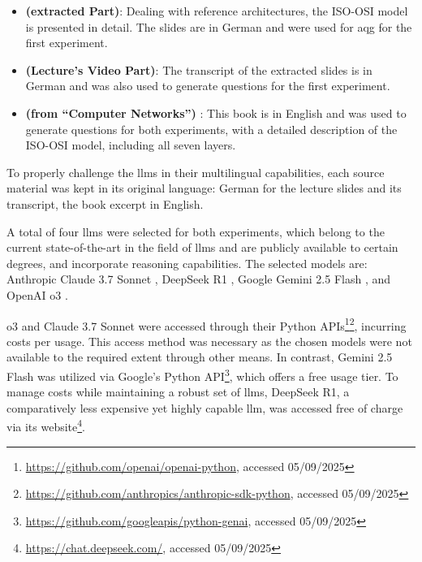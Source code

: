 \begin{itemize}
    \item {} \textbf{(extracted Part)}: Dealing with reference architectures, the ISO-OSI model is presented in detail. The slides are in German and were used for \ac{aqg} for the first experiment.
    \item {} \textbf{(Lecture's Video Part)}: The transcript of the extracted slides is in German and was also used to generate questions for the first experiment.
    \item {} \textbf{(from \enquote{Computer Networks})} \cite{tanenbaum_computer_2013}: This book is in English and was used to generate questions for both experiments, with a detailed description of the ISO-OSI model, including all seven layers.
\end{itemize}

To properly challenge the \ac{llms} in their multilingual capabilities, each source material was kept in its original language: German for the lecture slides and its transcript, the book excerpt in English.

\pagebreak

 A total of four \ac{llms} were selected for both experiments, which belong to the current state-of-the-art in the field of \ac{llms} and are publicly available to certain degrees, and incorporate reasoning capabilities. The selected models are:
Anthropic Claude 3.7 Sonnet \cite{anthropic_claude_2025},
    DeepSeek R1 \cite{deepseek-ai_deepseek-r1_2025},
    Google Gemini 2.5 Flash \cite{kavukcuoglu_gemini_2025}, and
    OpenAI o3 \cite{openai_openai_2025-1}.

\vspace{1em}

o3 and Claude 3.7 Sonnet were accessed through their Python APIs\footnote{\label{fn:openai-api}\url{https://github.com/openai/openai-python}, accessed 05/09/2025}\footnote{\label{fn:anthropic-api}\url{https://github.com/anthropics/anthropic-sdk-python}, accessed 05/09/2025}, incurring costs per usage. This access method was necessary as the chosen models were not available to the required extent through other means. In contrast, Gemini 2.5 Flash was utilized via Google's Python API\footnote{\label{fn:google-api}\url{https://github.com/googleapis/python-genai}, accessed 05/09/2025}, which offers a free usage tier. To manage costs while maintaining a robust set of \ac{llms}, DeepSeek R1, a comparatively less expensive yet highly capable \ac{llm}, was accessed free of charge via its website\footnote{\label{fn:deepseek}\url{https://chat.deepseek.com/}, accessed 05/09/2025}.

